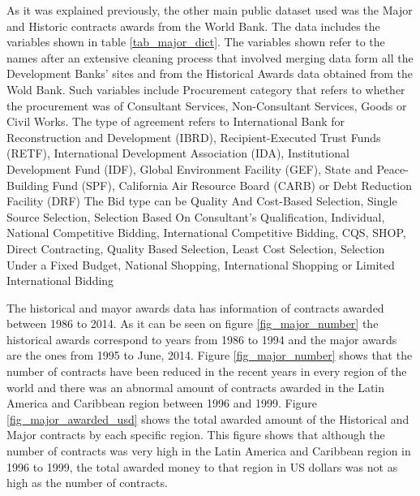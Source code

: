 As it was explained previously, the other main public dataset used was the Major and Historic contracts awards from the World Bank. The data includes the variables shown in table \ref{tab_major_dict}. The variables shown refer to the names after an extensive cleaning process that involved merging data form all the Development Banks' sites and from the Historical Awards data obtained from the Wold Bank. Such variables include Procurement category that refers to whether the procurement was  of  Consultant Services, Non-Consultant Services, Goods or Civil Works. The type of agreement refers to  International Bank for Reconstruction and Development (IBRD),  
Recipient-Executed Trust Funds (RETF), International Development Association (IDA), Institutional Development Fund (IDF), Global Environment Facility (GEF), State and Peace-Building Fund (SPF), California Air Resource Board (CARB) or Debt Reduction Facility (DRF) The Bid type can be Quality And Cost-Based Selection, Single Source Selection, Selection Based On Consultant's Qualification, Individual, National Competitive Bidding, International Competitive Bidding, CQS, SHOP, Direct Contracting, Quality Based Selection, Least Cost Selection, Selection Under a Fixed Budget, National Shopping, International Shopping or Limited International Bidding

The historical and mayor awards data has information of contracts awarded between 1986 to 2014. As it can be seen on figure \ref{fig_major_number} the historical awards correspond to years from 1986 to 1994 and the major awards are the ones from 1995 to June, 2014. Figure \ref{fig_major_number} shows that  the number of contracts have been reduced in the recent years in every region of the world and there was an abnormal amount of contracts awarded in the Latin America and Caribbean region between 1996 and 1999.  Figure \ref{fig_major_awarded_usd}  shows the total awarded amount of the Historical and Major contracts by each specific region. This figure shows that although the number of contracts was very high in the Latin America and Caribbean region in 1996 to 1999, the total awarded money to that region in US dollars was not as high as the number of contracts. 



